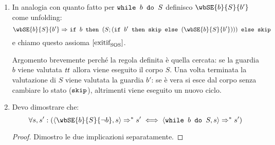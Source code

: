 {
	\begin{enumerate}
\item In analogia con quanto fatto per $\mbox{\normalfont{\texttt{while }}} b \textrm{\normalfont{\texttt{ do }}} S$ definisco $\wbSE{b}{S}{b'}$ come unfolding:
$$
\wbSE{b}{S}{b'} \Rar{ } \ifABC{b}{(S; (\ifABC{b'}{\skipForFriends}{(\wbSE{b}{S}{b'})}))}{\skipForFriends} 
$$	
e chiamo questo assioma $[ \textrm{\normalfont{exitif}} ^ \textrm{\normalfont{}} _\textrm{\normalfont{SOS}} ]$.

Argomento brevemente perché la regola definita è quella cercata:
se la guardia $b$ viene valutata $\mbox{\textit{tt}}$ allora viene eseguito il corpo
$S$. Una volta terminata la valutazione di $S$ viene valutata la guardia $b'$:
se è vera si esce dal corpo senza cambiare lo stato ($\textrm{\normalfont{\texttt{skip}}}$),
altrimenti viene eseguito un nuovo ciclo.
\item Devo dimostrare che:
$$
\forall s, s' : (\confSs{\wbSE{b}{S}{\neg b}}{s} \Rar{*} s' \iff  \confSs{\wbS{b}{S}}{s} \Rar{*} s')
$$
\begin{proof}
Dimostro le due implicazioni separatamente.


\end{proof}
\end{enumerate}}
